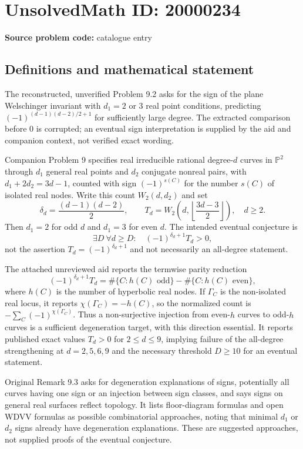 \documentclass[11pt]{article}
\newcommand{\PP}{\mathbb{P}}
\begin{document}
\section*{UnsolvedMath ID: 20000234}
\textbf{Source problem code:} catalogue entry
\subsection{Definitions and mathematical statement}
The reconstructed, unverified Problem 9.2 asks for the sign of the plane Welschinger invariant with $d_1=2$ or $3$ real point conditions, predicting $(-1)^{(d-1)(d-2)/2+1}$ for sufficiently large degree. The extracted comparison before $0$ is corrupted; an eventual sign interpretation is supplied by the aid and companion context, not verified exact wording.

Companion Problem 9 specifies real irreducible rational degree-$d$ curves in $\PP^2$ through $d_1$ general real points and $d_2$ conjugate nonreal pairs, with $d_1+2d_2=3d-1$, counted with sign $(-1)^{s(C)}$ for the number $s(C)$ of isolated real nodes. Write this count $W_2(d,d_2)$ and set
\[
\delta_d=\frac{(d-1)(d-2)}2,\qquad
T_d=W_2\!\left(d,\left\lfloor\frac{3d-3}2\right\rfloor\right),\quad d\ge2.
\]
Then $d_1=2$ for odd $d$ and $d_1=3$ for even $d$. The intended eventual conjecture is
\[
\exists D\ \forall d\ge D:\quad (-1)^{\delta_d+1}T_d>0,
\]
not the assertion $T_d=(-1)^{\delta_d+1}$ and not necessarily an all-degree statement.

The attached unreviewed aid reports the termwise parity reduction
\[
(-1)^{\delta_d+1}T_d
=\#\{C:h(C)\text{ odd}\}-\#\{C:h(C)\text{ even}\},
\]
where $h(C)$ is the number of hyperbolic real nodes. If $\Gamma_C$ is the non-isolated real locus, it reports $\chi(\Gamma_C)=-h(C)$, so the normalized count is $-\sum_C(-1)^{\chi(\Gamma_C)}$. Thus a non-surjective injection from even-$h$ curves to odd-$h$ curves is a sufficient degeneration target, with this direction essential. It reports published exact values $T_d>0$ for $2\le d\le9$, implying failure of the all-degree strengthening at $d=2,5,6,9$ and the necessary threshold $D\ge10$ for an eventual statement.

Original Remark 9.3 asks for degeneration explanations of signs, potentially all curves having one sign or an injection between sign classes, and says signs on general real surfaces reflect topology. It lists floor-diagram formulas and open WDVV formulas as possible combinatorial approaches, noting that minimal $d_1$ or $d_2$ signs already have degeneration explanations. These are suggested approaches, not supplied proofs of the eventual conjecture.
\end{document}
